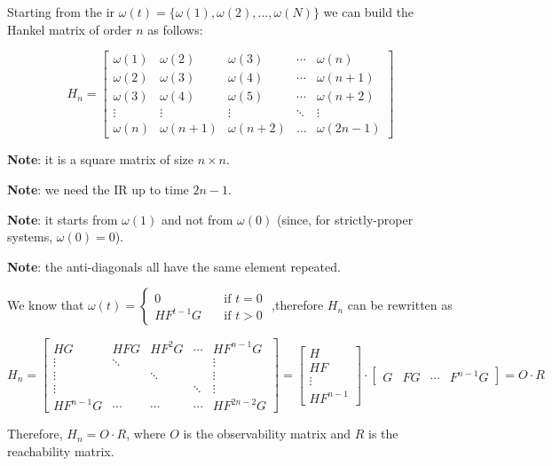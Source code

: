 \begin{definition}
    Starting from the \gls{ir} $\omega(t) = \{\omega(1), \omega(2), \ldots, \omega(N)\}$ we can build the Hankel matrix of order $n$ as follows:

\[
    H_n = \begin{bmatrix}
        \omega(1) & \omega(2) & \omega(3) & \cdots & \omega(n) \\
        \omega(2) & \omega(3) & \omega(4) & \cdots & \omega(n+1) \\
        \omega(3) & \omega(4) & \omega(5) & \cdots & \omega(n+2) \\
        \vdots    & \vdots    & \vdots    & \ddots & \vdots \\
        \omega(n) & \omega(n+1) & \omega(n+2) & \ldots & \omega(2n-1)
    \end{bmatrix}
\]

    \textbf{Note}: it is a square matrix of size $n\times n$.

    \textbf{Note}: we need the IR up to time $2n-1$.

    \textbf{Note}: it starts from $\omega(1)$ and not from $\omega(0)$ (since, for strictly-proper systems, $\omega(0)=0$).

    \textbf{Note}: the anti-diagonals all have the same element repeated.
    
    We know that $\omega(t) = \begin{cases}
    0 &\quad \text{if } t = 0 \\
    HF^{t-1}G &\quad \text{if } t > 0
    \end{cases}$ ,\qquad therefore $H_n$ can be rewritten as

    \[
        H_n = \begin{bmatrix}
            HG     & HFG    & HF^2G  & \cdots & HF^{n-1}G \\
            \vdots & \ddots &        &        & \vdots \\
            \vdots &        & \ddots &        & \vdots \\
            \vdots &        &        & \ddots & \vdots \\
            HF^{n-1}G & \cdots & \cdots & \cdots & HF^{2n-2}G
        \end{bmatrix} = \begin{bmatrix}
            H \\
            HF \\
            \vdots \\
            HF^{n-1}
        \end{bmatrix} \cdot \begin{bmatrix}
            G & FG & \cdots & F^{n-1}G
        \end{bmatrix} = O \cdot R
    \]
    
    
    Therefore, $H_n = O \cdot R$, where $O$ is the observability matrix and $R$ is the reachability matrix.
\end{definition}




